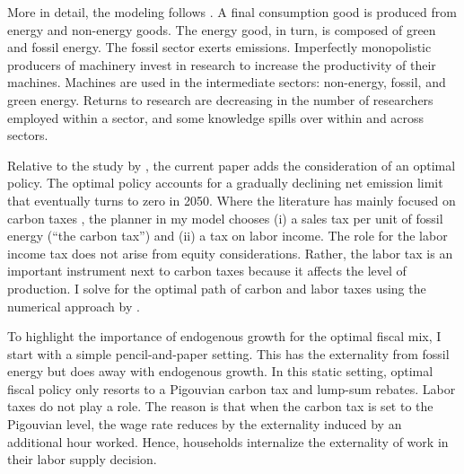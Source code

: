 More in detail, the modeling follows \cite{Fried2018ClimateAnalysis}. A final consumption good is produced from energy and non-energy goods. The energy good, in turn, is composed of green and fossil energy. The fossil sector exerts emissions. Imperfectly monopolistic producers of machinery invest in research to increase the productivity of their machines. Machines are used in the intermediate sectors: non-energy, fossil, and green energy. Returns to research are decreasing in the number of researchers employed within a sector, and some knowledge spills over within and across sectors.

Relative to the study by \cite{Fried2018ClimateAnalysis}, the current paper adds the consideration of an optimal policy. The optimal policy accounts for a gradually declining  net emission limit that eventually turns to zero in 2050. Where the literature  has mainly focused on carbon taxes \citep{Acemoglu2012TheChange, Fried2018ClimateAnalysis}, the planner in my model chooses (i) a sales tax per unit of fossil energy (“the carbon tax”) and (ii) a tax on labor income. The role for the labor income tax does not arise from equity considerations. Rather, the labor tax is an important instrument next to carbon taxes because it affects the level of production.  I solve for the optimal path of carbon and labor taxes using the numerical approach by  \citep{Jones1993OptimalGrowth, Barrage2019OptimalPolicy}.

To highlight the importance of endogenous growth for the optimal fiscal mix, I start with a simple pencil-and-paper setting. This has the externality from fossil energy but does away with endogenous growth. In this static setting, optimal fiscal policy only resorts to a Pigouvian carbon tax and lump-sum rebates. Labor taxes do not play a role. The reason is that when the carbon tax is set to the Pigouvian level, the wage rate reduces by the externality induced by an additional hour worked. Hence, households internalize the externality of work in their labor supply decision.

